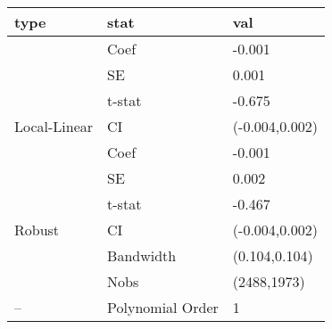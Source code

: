 
\begin{tabular}{lll}
\toprule
type & stat & val\\
\midrule
 & Coef & -0.001\\

 & SE & 0.001\\

 & t-stat & -0.675\\

\multirow{-4}{*}{\raggedright\arraybackslash Local-Linear} & CI & (-0.004,0.002)\\
\cmidrule{1-3}
 & Coef & -0.001\\

 & SE & 0.002\\

 & t-stat & -0.467\\

\multirow{-4}{*}{\raggedright\arraybackslash Robust} & CI & (-0.004,0.002)\\
\cmidrule{1-3}
 & Bandwidth & (0.104,0.104)\\

 & Nobs & (2488,1973)\\

\multirow{-3}{*}{\raggedright\arraybackslash --} & Polynomial Order & 1\\
\bottomrule
\end{tabular}